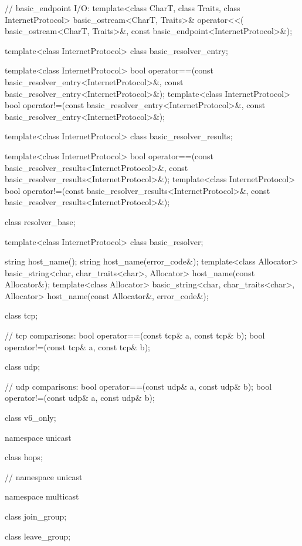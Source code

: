 \begin{codeblock}
{{{{{  // basic_endpoint I/O:
  template<class CharT, class Traits, class InternetProtocol>
    basic_ostream<CharT, Traits>& operator<<(
      basic_ostream<CharT, Traits>&,
      const basic_endpoint<InternetProtocol>&);

  template<class InternetProtocol>
    class basic_resolver_entry;

  template<class InternetProtocol>
    bool operator==(const basic_resolver_entry<InternetProtocol>&,
                    const basic_resolver_entry<InternetProtocol>&);
  template<class InternetProtocol>
    bool operator!=(const basic_resolver_entry<InternetProtocol>&,
                    const basic_resolver_entry<InternetProtocol>&);

  template<class InternetProtocol>
    class basic_resolver_results;

  template<class InternetProtocol>
    bool operator==(const basic_resolver_results<InternetProtocol>&,
                    const basic_resolver_results<InternetProtocol>&);
  template<class InternetProtocol>
    bool operator!=(const basic_resolver_results<InternetProtocol>&,
                    const basic_resolver_results<InternetProtocol>&);

  class resolver_base;

  template<class InternetProtocol>
    class basic_resolver;

  string host_name();
  string host_name(error_code&);
  template<class Allocator>
    basic_string<char, char_traits<char>, Allocator>
      host_name(const Allocator&);
  template<class Allocator>
    basic_string<char, char_traits<char>, Allocator>
      host_name(const Allocator&, error_code&);

  class tcp;

  // tcp comparisons:
  bool operator==(const tcp& a, const tcp& b);
  bool operator!=(const tcp& a, const tcp& b);

  class udp;

  // udp comparisons:
  bool operator==(const udp& a, const udp& b);
  bool operator!=(const udp& a, const udp& b);

  class v6_only;

  namespace unicast {

    class hops;

  } // namespace unicast

  namespace multicast {

    class join_group;

    class leave_group;

}}}}}}
\end{codeblock}
